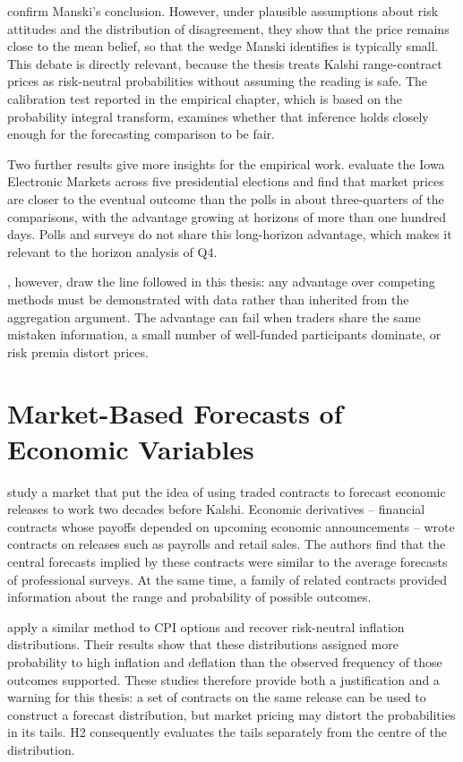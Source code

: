 \documentclass[12pt,a4paper]{report}
\begin{document}
\textcite{wolfers2006} confirm Manski's conclusion.
However, under plausible assumptions about risk attitudes and the distribution of
disagreement, they show that the price remains close to the mean belief,
so that the wedge Manski identifies is typically small. This debate is
directly relevant, because the thesis treats Kalshi range-contract prices
as risk-neutral probabilities without assuming the reading is safe. The calibration test reported in the
empirical chapter, which is based on the probability integral transform,
examines whether that inference holds closely enough for the forecasting
comparison to be fair.

Two further results give more insights for the empirical work.
\textcite{berg2008} evaluate the Iowa Electronic Markets across five
presidential elections and find that market prices are closer to the
eventual outcome than the polls in about three-quarters of the
comparisons, with the advantage growing at horizons of more than one
hundred days. Polls and surveys do not share this long-horizon advantage, which
makes it relevant to the horizon analysis of Q4.

\textcite{snowberg2013},
however, draw the line followed in this thesis: any advantage over competing
methods must be demonstrated with data rather than inherited from the
aggregation argument. The advantage can fail when traders share the same
mistaken information, a small number of well-funded participants dominate, or
risk premia distort prices.

\section{Market-Based Forecasts of Economic Variables}
\label{sec:lit-macromarkets}

\textcite{gurkaynak2006} study a market that put the idea of using traded contracts to forecast economic releases to work two decades
before Kalshi. Economic derivatives -- financial contracts whose payoffs depended on upcoming economic announcements -- wrote contracts on releases such as
payrolls and retail sales. The authors find that the central forecasts implied by these contracts were similar to the average forecasts of professional surveys. At the same time, a family of related contracts provided information about the range and probability of possible outcomes.

\textcite{kitsul2013} apply a similar method to CPI options and recover risk-neutral inflation distributions. Their results show that these distributions assigned more probability to high inflation and deflation than the observed frequency of those outcomes supported. These studies therefore provide both a justification and a warning for this thesis: a set of contracts on the same release can be used to construct a forecast distribution, but market pricing may distort the probabilities in its tails. H2 consequently evaluates the tails separately from the centre of the distribution.
\end{document}
